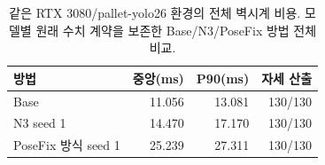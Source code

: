 \begin{table}[t]\centering\footnotesize
\caption{같은 RTX 3080/pallet-yolo26 환경의 전체 벽시계 비용. 모델별 원래 수치 계약을 보존한 Base/N3/PoseFix 방법 전체 비교.}\label{tab:matched_runtime}
\begin{tabularx}{\columnwidth}{Yrrr}\toprule
방법 & 중앙(ms) & P90(ms) & 자세 산출 \\\midrule
Base & 11.056 & 13.081 & 130/130 \\
N3 seed 1 & 14.470 & 17.170 & 130/130 \\
PoseFix 방식 seed 1 & 25.239 & 27.311 & 130/130 \\
\bottomrule\end{tabularx}
\end{table}
